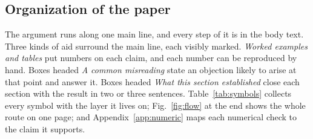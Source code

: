 \documentclass[%
 reprint, amsmath,amssymb, aps, prb, ]{revtex4-2}
\numberwithin{equation}{section}
\begin{document}
\subsection{Organization of the paper}

The argument runs along one main line, and every step of it is in the body text. Three kinds of aid surround the main line, each visibly marked. \emph{Worked examples and tables} put numbers on each claim, and each number can be reproduced by hand. Boxes headed \emph{A common misreading} state an objection likely to arise at that point and answer it. Boxes headed \emph{What this section established} close each section with the result in two or three sentences. Table~\ref{tab:symbols} collects every symbol with the layer it lives on; Fig.~\ref{fig:flow} at the end shows the whole route on one page; and Appendix~\ref{app:numeric} maps each numerical check to the claim it supports.
\end{document}
